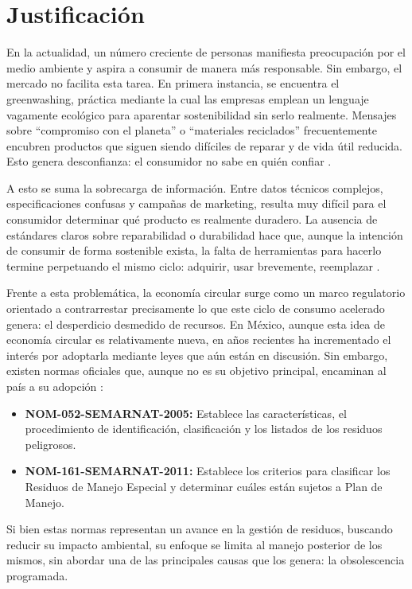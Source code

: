 \section{Justificación}

En la actualidad, un número creciente de personas manifiesta preocupación por el
medio ambiente y aspira a consumir de manera más responsable. Sin embargo, el
mercado no facilita esta tarea. En primera instancia, se encuentra el
greenwashing, práctica mediante la cual las empresas emplean un lenguaje
vagamente ecológico para aparentar sostenibilidad sin serlo realmente. Mensajes
sobre ``compromiso con el planeta'' o ``materiales reciclados'' frecuentemente
encubren productos que siguen siendo difíciles de reparar y de vida útil
reducida. Esto genera desconfianza: el consumidor no sabe en quién confiar
\parencite[p.~9]{holloway2025}.

A esto se suma la sobrecarga de información. Entre datos técnicos complejos,
especificaciones confusas y campañas de marketing, resulta muy difícil para el
consumidor determinar qué producto es realmente duradero. La ausencia de
estándares claros sobre reparabilidad o durabilidad hace que, aunque la
intención de consumir de forma sostenible exista, la falta de herramientas para
hacerlo termine perpetuando el mismo ciclo: adquirir, usar brevemente,
reemplazar \parencite[p.~9]{holloway2025}.

Frente a esta problemática, la economía circular surge como un marco regulatorio
orientado a contrarrestar precisamente lo que este ciclo de consumo acelerado
genera: el desperdicio desmedido de recursos. En México, aunque esta idea de
economía circular es relativamente nueva, en años recientes ha incrementado el
interés por adoptarla mediante leyes que aún están en discusión. Sin embargo,
existen normas oficiales que, aunque no es su objetivo principal, encaminan al
país a su adopción \parencite[p.~220]{munoz2023}:

\begin{itemize}
    \item \textbf{NOM-052-SEMARNAT-2005:} Establece las características, el
    procedimiento de identificación, clasificación y los listados de los
    residuos peligrosos.
    \item \textbf{NOM-161-SEMARNAT-2011:} Establece los criterios para
    clasificar los Residuos de Manejo Especial y determinar cuáles están sujetos
    a Plan de Manejo.
\end{itemize}

Si bien estas normas representan un avance en la gestión de residuos, buscando
reducir su impacto ambiental, su enfoque se limita al manejo posterior de los
mismos, sin abordar una de las principales causas que los genera: la
obsolescencia programada. 

